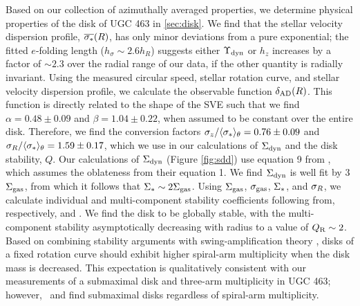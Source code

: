 \documentclass[apj,iop,numberedappendix]{emulateapj}
\begin{document}
Based on our collection of azimuthally averaged properties, we determine
physical properties of the disk of UGC 463 in \sect \ref{sec:disk}.  We find
that the stellar velocity dispersion profile, $\overline{\sigma_{\ast}}(R)$, has only
minor deviations from a pure exponential; the fitted $e$-folding length
($h_{\sigma}\sim 2.6h_R$) suggests either $\Upsilon_{\rm dyn}$ or $h_z$ increases by a
factor of $\sim2.3$ over the radial range of our data, if the other quantity is
radially invariant.  Using the measured circular speed, stellar rotation curve,
and stellar velocity dispersion profile, we calculate the observable function
$\delta_{\rm AD}(R)$.  This function is directly related to the shape of the SVE such that
we find $\alpha = 0.48\pm0.09$ and $\beta = 1.04\pm0.22$, when assumed to be
constant over the entire disk.  Therefore, we find the conversion factors
$\sigma_z/\langle\sigma_{\ast}\rangle_{\theta} = 0.76\pm0.09$ and
$\sigma_R/\langle\sigma_{\ast}\rangle_{\theta} = 1.59\pm0.17$, which we use in our
calculations of $\Sigma_{\rm dyn}$ and the disk stability, $Q$.  Our calculations of
$\Sigma_{\rm dyn}$ (Figure \ref{fig:sdd}) use equation 9 from
, which assumes the oblateness from their
equation 1.  We find $\Sigma_{\rm dyn}$ is well fit by 3$\Sigma_{\rm gas}$, from which it follows
that $\Sigma_{\rm \ast}\sim2\Sigma_{\rm gas}$.  Using $\Sigma_{\rm gas}$, $\sigma_{\rm gas}$, $\Sigma_{\rm \ast}$, and $\sigma_R$, we calculate
individual and multi-component stability coefficients following from,
respectively, \citet{1964ApJ...139.1217T} and \citet{2001MNRAS.323..445R}.  We
find the disk to be globally stable, with the multi-component stability
asymptotically decreasing with radius to a value of $Q_{\rm R}\sim2$.  Based on
combining stability arguments with swing-amplification theory
\citep{1981seng.proc..111T, 1987A&A...179...23A}, disks of a fixed rotation
curve should exhibit higher spiral-arm multiplicity when the disk mass is
decreased.  This expectation is qualitatively consistent with our measurements
of a submaximal disk and three-arm multiplicity in UGC 463; however, \pV\ and
\citet{TPKMPhD} find submaximal disks regardless of spiral-arm multiplicity.
\end{document}
